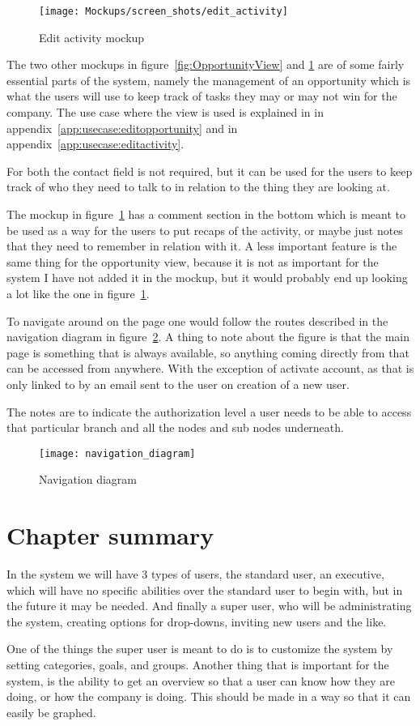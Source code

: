 \begin{figure}[!htb]
  \centering
  \texttt{[image: Mockups/screen\_shots/edit\_activity]}
  \caption{Edit activity mockup}
  \label{fig:ActivityView}
\end{figure}

The two other mockups in figure~\ref{fig:OpportunityView} and
\ref{fig:ActivityView} are of some fairly essential parts of the system, namely
the management of an opportunity which is what the users will use to keep track
of tasks they may or may not win for the company. The use case where the view is
used is explained in  in
appendix~\ref{app:usecase:editopportunity} and
 in appendix~\ref{app:usecase:editactivity}.


For both the contact field is
not required, but it can be used for the users to keep track of who they need to
talk to in relation to the thing they are looking at.

The mockup in figure~\ref{fig:ActivityView} has a comment section in the bottom
which is meant to be used as a way for the users to put recaps of the activity,
or maybe just notes that they need to remember in relation with it. A less
important feature is the same thing for the opportunity view, because it is not
as important for the system I have not added it in the mockup, but it would
probably end up looking a lot like the one in figure~\ref{fig:ActivityView}. 

To navigate around on the page one would follow the routes described in the
navigation diagram in figure~\ref{fig:navigation_diagram}. A thing to note about
the figure is that the main page is something that is always available, so
anything coming directly from that can be accessed from anywhere. With the
exception of activate account, as that is only linked to by an email sent to the
user on creation of a new user.

The notes are to indicate the authorization level a user needs to be able to
access that particular branch and all the nodes and sub nodes underneath.

\begin{figure}[!htb]
  \centering
  \texttt{[image: navigation\_diagram]}
  \caption{Navigation diagram}
  \label{fig:navigation_diagram}
\end{figure}

\section{Chapter summary}
In the system we will have 3 types of users, the standard user, an executive,
which will have no specific abilities over the standard user to begin with, but
in the future it may be needed. And finally a super user, who will be
administrating the system, creating options for drop-downs, inviting new users
and the like.

One of the things the super user is meant to do is to customize the system by
setting categories, goals, and groups. Another thing that is important for the system,
is the ability to get an overview so that a user can know how they are doing, or
how the company is doing. This should be made in a way so that it can easily be
graphed.
